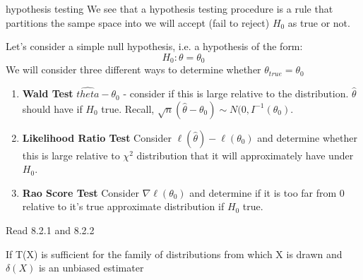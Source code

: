 \documentclass[11pt,fleqn]{book} %
\begin{document}
\begin{definition}{hypothesis testing}
	We see that a hypothesis testing procedure is a rule that partitions the sampe space into we will accept (fail to reject) $H_0$ as true or not.
\end{definition}

Let's consider a simple null hypothesis, i.e. a hypothesis of the form:
$$H_0: \theta=\theta_0 $$
We will consider three different ways to determine whether $\theta_{true} = \theta_0$

\begin{enumerate}
	\item \textbf{Wald Test} $\hat{theta} - \theta_0$ - consider if this is large relative to the distribution. $\hat{\theta}$ should have if $H_0$ true. Recall, $\sqrt{n}(\hat{\theta}-\theta_0)\sim N(0,I^{-1}(\theta_0)$.
	\item \textbf{Likelihood Ratio Test} Consider $\ell(\hat{\theta}) - \ell(\theta_0)$ and determine whether this is large relative to $\chi^2$ distribution that it will approximately have under $H_0$. 
	\item \textbf{Rao Score Test} Consider $\nabla\ell(\theta_0)$ and determine if it is too far from 0 relative to it's true approximate distribution if $H_0$ true.  
\end{enumerate}

\begin{remark}
	Read 8.2.1 and 8.2.2
\end{remark}

\begin{theorem}
	If T(X) is sufficient for the family of distributions from which X is drawn and $\delta(X)$ is an unbiased estimater 
\end{theorem}

\end{document}
